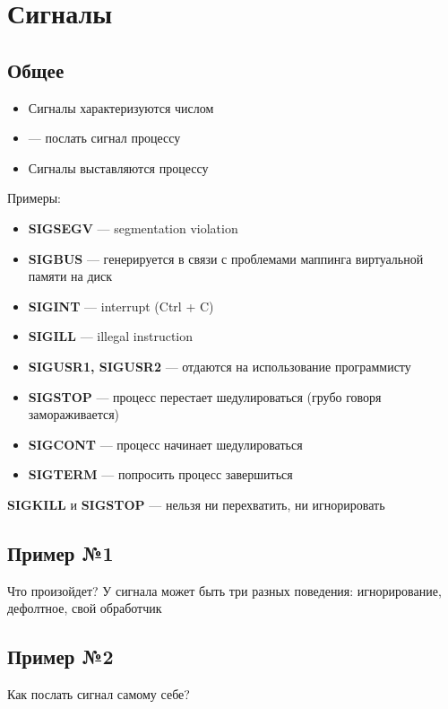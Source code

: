 \documentclass[../../lectures.tex]{subfiles}
\begin{document}
\newpage
\section{Сигналы}
\subsection{Общее}
\begin{itemize}
    \item Сигналы характеризуются числом
    \item {} --- послать сигнал процессу
    \item Сигналы выставляются процессу
\end{itemize}

Примеры:
\begin{itemize}
    \item \textbf{SIGSEGV} --- segmentation violation
    \item \textbf{SIGBUS} --- генерируется в связи с проблемами маппинга виртуальной памяти на диск 
    \item \textbf{SIGINT} --- interrupt (Ctrl + C)
    \item \textbf{SIGILL} --- illegal instruction
    \item \textbf{SIGUSR1, SIGUSR2} --- отдаются на использование программисту
    \item \textbf{SIGSTOP} --- процесс перестает шедулироваться (грубо говоря замораживается)
    \item \textbf{SIGCONT} --- процесс начинает шедулироваться 
    \item \textbf{SIGTERM} --- попросить процесс завершиться
\end{itemize}
\textbf{SIGKILL} и \textbf{SIGSTOP} --- нельзя ни перехватить, ни игнорировать

\newpage
\subsection{Пример №1}
Что произойдет?
У сигнала может быть три разных поведения: игнорирование, дефолтное, свой обработчик\\

\subsection{Пример №2}
Как послать сигнал самому себе?
\end{document}
